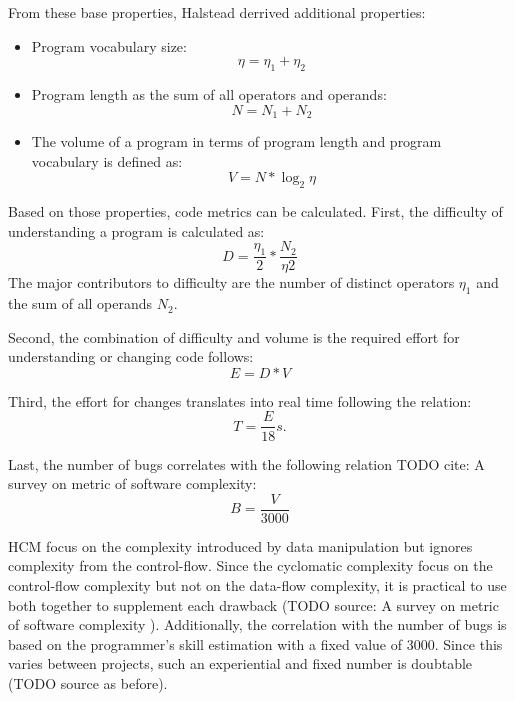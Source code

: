 From these base properties, Halstead derrived additional properties:
\begin{itemize}
    \item Program vocabulary size:
    \begin{displaymath}
        \eta = \eta_1 + \eta_2
    \end{displaymath}
    \item Program length as the sum of all operators and operands:
    \begin{displaymath}
        N = N_1 + N_2
    \end{displaymath}
    \item The volume of a program in terms of program length and program vocabulary is defined as: 
    \begin{displaymath}
        V = N * \log_2{\eta}
    \end{displaymath}
\end{itemize}

Based on those properties, code metrics can be calculated. 
First, the difficulty of understanding a program is calculated as:
\begin{displaymath}
    D = \frac{\eta_1}{2} * \frac{N_2}{\eta2}
\end{displaymath}
The major contributors to difficulty are the number of distinct operators $\eta_1$ and the sum of all operands $N_2$.

Second, the combination of difficulty and volume is the required effort for understanding or changing code follows:
\begin{displaymath}
    E = D * V
\end{displaymath}

Third, the effort for changes translates into real time following the relation:
\begin{displaymath}
    T = \frac{E}{18}s.
\end{displaymath}

Last, the number of bugs correlates with the following relation TODO cite: A survey on metric of software complexity:
\begin{displaymath}
    B = \frac{V}{3000}
\end{displaymath}

HCM focus on the complexity introduced by data manipulation but ignores complexity from the control-flow. Since the cyclomatic complexity focus on the control-flow complexity but not on the data-flow complexity, it is practical to use both together to supplement each drawback (TODO source: A survey on metric of software complexity
). Additionally, the correlation with the number of bugs is based on the programmer's skill estimation with a fixed value of 3000. Since this varies between projects, such an experiential and fixed number is doubtable (TODO source as before).

